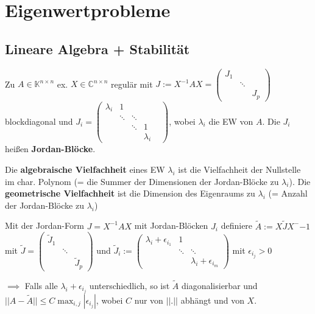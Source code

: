 \section{Eigenwertprobleme}

\subsection{Lineare Algebra + Stabilität}

\begin{theorem}
	Zu $A \in \mathbb{K}^{n\times n}$ ex. $X \in \mathbb{C}^{n\times n}$ regulär mit $J := X^{-1}AX = \left(\begin{matrix}
		J_1 & &\\
		 & \ddots &\\
		 & & J_p
	\end{matrix}\right)$ blockdiagonal und $J_i = \left(\begin{matrix}
		\lambda_i & 1 & & &\\
		 & \ddots & \ddots & &\\
		  & & \ddots & 1\\
		  & & & \lambda_i
	\end{matrix}\right)$, wobei $\lambda_i$ die EW von $A$. Die $J_i$ heißen \textbf{Jordan-Blöcke}.
\end{theorem}

\begin{remark}
	Die \textbf{algebraische Vielfachheit} eines EW $\lambda_i$ ist die Vielfachheit der Nullstelle im char. Polynom (= die Summer der Dimensionen der Jordan-Blöcke zu $\lambda_i$). Die \textbf{geometrische Vielfachheit} ist die Dimension des Eigenraums zu $\lambda_i$ (= Anzahl der Jordan-Blöcke zu $\lambda_i$)
\end{remark}

\begin{corollary}
	Mit der Jordan-Form $J=X^{-1}AX$ mit Jordan-Blöcken $J_i$ definiere $\tilde{A}:= X\tilde{J}X^-{-1}$ mit $\tilde{J} = \left(\begin{matrix}
		\tilde{J}_1 & &\\
		 & \ddots &\\
		 & & \tilde{J}_p
	\end{matrix}\right)$ und $\tilde{J}_i := \left(\begin{matrix}
		\lambda_i + \epsilon_{i_1} & 1\\
		 & \ddots & \ddots\\
		  & & \lambda_i + \epsilon_{i_m}
	\end{matrix}\right)$ mit $\epsilon_{i_j} > 0$
	
	$\implies$ Falls alle $\lambda_i + \epsilon_{i_j}$ unterschiedlich, so ist $\tilde{A}$ diagonalisierbar und $||A - \tilde{A}|| \leq C \max_{i,j}|\epsilon_{i_j}|$, wobei $C$ nur von $||.||$ abhängt und von $X$.
\end{corollary}

